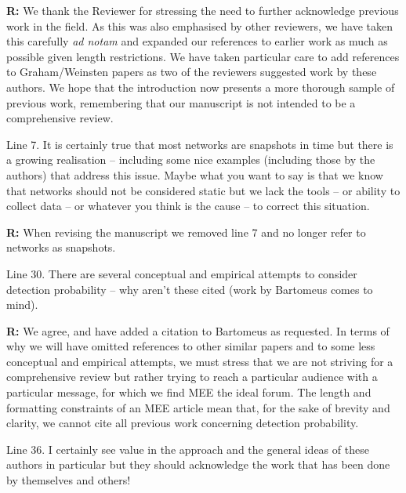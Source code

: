\documentclass[12pt]{letter}
\newenvironment{refquote}{\bigskip \begin{it}}{\end{it}\smallskip}
\begin{document}
		\textbf{R:} We thank the Reviewer for stressing the need to further acknowledge previous work in the field. As this was also emphasised by other reviewers, we have taken this carefully \emph{ad notam} and expanded our references to earlier work as much as possible given length restrictions. We have taken particular care to add references to Graham/Weinsten papers as two of the reviewers suggested work by these authors. We hope that the introduction now presents a more thorough sample of previous work, remembering that our manuscript is not intended to be a comprehensive review.


		\begin{refquote}
		Line 7.  It is certainly true that most networks are snapshots in time but there is a growing realisation – including some nice examples (including those by the authors) that address this issue.  Maybe what you want to say is that we know that networks should not be considered static but we lack the tools – or ability to collect data – or whatever you think is the cause – to correct this situation. 
		\end{refquote}


		\textbf{R:} When revising the manuscript we removed line 7 and no longer refer to networks as snapshots.


		\begin{refquote}
		Line 30.  There are several conceptual and empirical attempts to consider detection probability – why aren't these cited (work by Bartomeus comes to mind).\\
		\end{refquote}


			\textbf{R:} We agree, and have added a citation to Bartomeus as requested. In terms of why we will have omitted references to other similar papers and to some less conceptual and empirical attempts, we must stress that we are not striving for a comprehensive review but rather trying to reach a particular audience with a particular message, for which we find MEE the ideal forum. The length and formatting constraints of an MEE article mean that, for the sake of brevity and clarity, we cannot cite all previous work concerning detection probability.


		\begin{refquote}
			Line 36.  I certainly see value in the approach and the general ideas of these authors in particular but they should acknowledge the work that has been done by themselves and others!\\
		\end{refquote}
\end{document}
